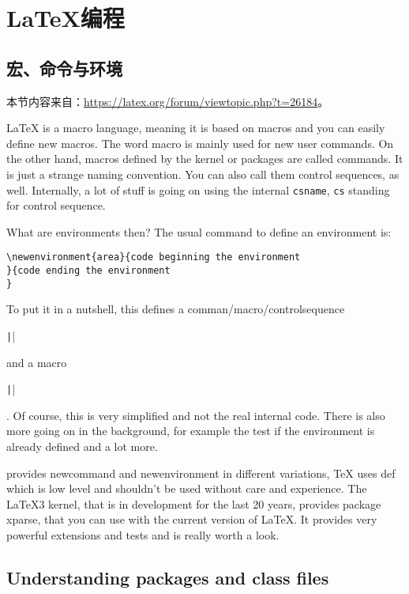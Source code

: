 \chapter{{\LaTeX 编程}}

\section{宏、命令与环境}

本节内容来自：\url{https://latex.org/forum/viewtopic.php?t=26184}。

{\LaTeX} is a macro language, meaning it is based on macros and you can easily define new macros. The word macro is mainly used for new user commands. On the other hand, macros defined by the kernel or packages are called commands. It is just a strange naming convention.
You can also call them control sequences, as well. Internally, a lot of stuff is going on using the internal \verb|csname|, \verb|cs| standing for control sequence.

What are environments then? The usual command to define an environment is:

\begin{verbatim}
\newenvironment{area}{code beginning the environment
}{code ending the environment
}
\end{verbatim}

To put it in a nutshell, this defines a comman/macro/controlsequence 

\texttt|\newcommand{\area}{code beginning the environment}|

and a macro 

\texttt|\newcommand{\endmacro}{code to end the environment}|

.
Of course, this is very simplified and not the real internal code. There is also more going on in the background, for example the test if the environment is already defined and a lot more.


{\LaTeXe} provides {\ttfamily newcommand} and {\ttfamily newenvironment} in different variations, 
{\TeX} uses {\ttfamily def} which is low level and shouldn't be used without care and experience.
The {\LaTeX3} kernel, that is in development for the last 20 years, provides package xparse, 
that you can use with the current version of {\LaTeX}. It provides very powerful extensions and tests and is really worth a look.

\section{Understanding packages and class files}

